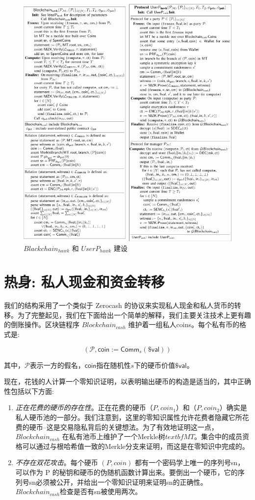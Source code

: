 \documentclass{xduugtrans}
\begin{document}
\begin{figure}
    \centering
    \includegraphics[width=.7\linewidth]{6}
    \caption{$Blackchain_{hawk}$ 和 $UserP_{hawk}$ 建设}
    \label{fig6}
\end{figure}

\section{热身: 私人现金和资金转移}

我们的结构采用了一个类似于 Zerocash 的协议来实现私人现金和私人货币的转移。为了完整起见，我们在下面给出一个简单的解释，我们主要关注技术上更有趣的倒账操作。区块链程序 $Blockchain_{cash}$ 维护着一组私人coins。每个私有币的格式是:

\begin{equation}
    (\mathcal{P},\mathsf{coin}:=\mathsf{Comm}_{s}(\$\mathsf{val}))
\end{equation}

其中，$\mathcal{P}$表示一方的假名，$\mathsf{coin}$指在随机性$s$下的硬币价值$\$\mathsf{val}$。

现在，花钱的人计算一个零知识证明，以表明输出硬币的构造是适当的，其中正确性包括以下方面:

\begin{enumerate}
    \item \textit{正在花费的硬币的存在性}。正在花费的硬币$（P,coin_1）$和$（P,coin_2）$确实是私人硬币池的一部分。我们注意到，这里的零知识属性允许花费者隐藏它所花费的硬币--这是交易隐私背后的关键想法。为了有效地证明这一点，$Blockchain_{cash}$ 在私有池币上维护了一个Merkle树$textbf{MT}$。集合中的成员资格可以通过与根哈希值一致的Merkle分支来证明，而这是在零知识中完成的。
    \item \textit{不存在双花攻击}。每个硬币 $(P,coin)$ 都有一个密码学上唯一的序列号sn，可以作为 P 的秘钥和硬币的伪随机函数计算出来。要倒出一个硬币，它的序列号sn必须被公开，并给出一个零知识证明来证明sn的正确性。$Blockchain_{cash}$检查是否有sn被使用两次。
\end{enumerate}
\end{document}
